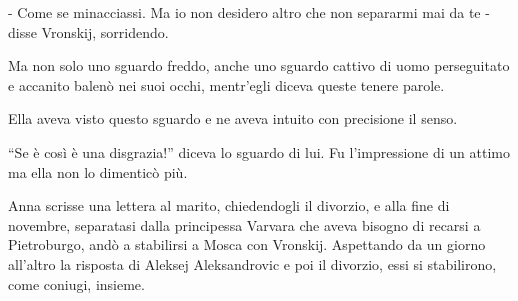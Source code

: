 - Come se minacciassi. Ma io non desidero altro che non separarmi mai da te - disse Vronskij, sorridendo. 

Ma non solo uno sguardo freddo, anche uno sguardo cattivo di uomo perseguitato e accanito balenò nei suoi occhi, mentr'egli diceva queste tenere parole. 

Ella aveva visto questo sguardo e ne aveva intuito con precisione il senso. 

``Se è così è una disgrazia!'' diceva lo sguardo di lui. Fu l'impressione di un attimo ma ella non lo dimenticò più. 

Anna scrisse una lettera al marito, chiedendogli il divorzio, e alla fine di novembre, separatasi dalla principessa Varvara che aveva bisogno di recarsi a Pietroburgo, andò a stabilirsi a Mosca con Vronskij. Aspettando da un giorno all'altro la risposta di Aleksej Aleksandrovic e poi il divorzio, essi si stabilirono, come coniugi, insieme. 
